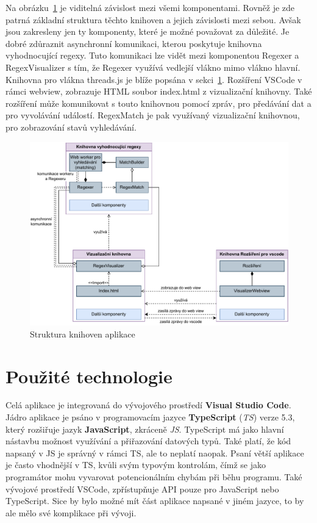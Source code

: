 Na obrázku~\ref{fig:ARCH} je viditelná závislost mezi všemi komponentami. 
Rovněž je zde patrná základní struktura těchto knihoven a jejich závislosti mezi sebou.
Avšak jsou zakresleny jen ty komponenty, které je možné považovat za důležité. 
Je dobré zdůraznit asynchronní komunikaci, kterou poskytuje knihovna vyhodnocující regexy.
Tuto komunikaci lze vidět mezi komponentou Regexer a RegexVisualizer s tím, že Regexer využívá vedlejší vlákno mimo vlákno hlavní. 
Knihovna pro vlákna threads.js je blíže popsána v sekci~\ref{sec:USEDtech}.
Rozšíření VSCode v rámci webview, zobrazuje HTML soubor index.html z vizualizační knihovny.
Také rozšíření může komunikovat s touto knihovnou pomocí zpráv, pro předávání dat a pro vyvolávání událostí. 
RegexMatch je pak využívaný vizualizační knihovnou, pro zobrazování stavů vyhledávání.

\begin{figure}[!h]
	\centering
	\includegraphics[width=.9\textwidth]{Figures/BP-Arch.pdf}
	\caption{Struktura knihoven aplikace}
	\label{fig:ARCH}
\end{figure}

\newpage

\section{Použité technologie}\label{sec:USEDtech}
Celá aplikace je integrovaná do vývojového prostředí \textbf{Visual Studio Code}. 
Jádro aplikace je psáno v programovacím jazyce \textbf{TypeScript} (\textit{TS}) verze 5.3, který rozšiřuje jazyk \textbf{JavaScript}, zkráceně \textit{JS}. 
TypeScript má jako hlavní nástavbu možnost využívání a přiřazování datových typů.
Také platí, že kód napsaný v JS je správný v rámci TS, ale to neplatí naopak.
Psaní větší aplikace je často vhodnější v TS, kvůli svým typovým kontrolám, čímž se jako programátor mohu vyvarovat potencionálním chybám při běhu programu.
Také vývojové prostředí VSCode, zpřístupňuje API pouze pro JavaScript nebo TypeScript.
Sice by bylo možné mít část aplikace napsané v jiném jazyce, to by ale mělo své komplikace při vývoji.

